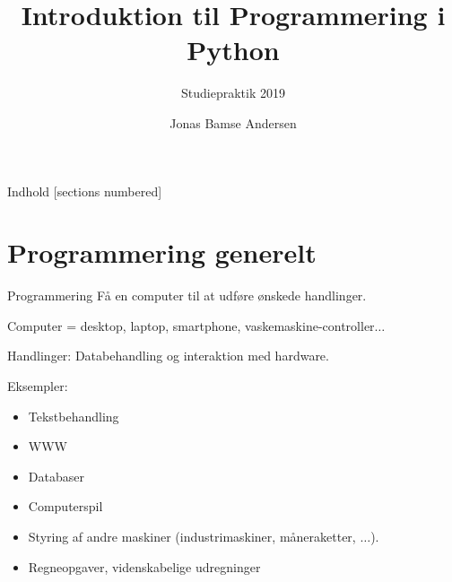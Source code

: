 \documentclass[10pt]{beamer}
\title{Introduktion til Programmering i Python}
\subtitle{Studiepraktik 2019}
\date{}
\author{Jonas Bamse Andersen}
\institute{Syddansk Universitet}
\begin{document}

\maketitle



\begin{frame}{Indhold}
  [sections numbered]
  \tableofcontents[hideallsubsections]
\end{frame}


\section{Programmering generelt}


\begin{frame}{Programmering}
Få en computer til at udføre ønskede handlinger.

\medskip

Computer = desktop, laptop, smartphone, vaskemaskine-controller$\dots$

\medskip

Handlinger: Databehandling og interaktion med hardware.

\medskip

Eksempler:

\begin{itemize}
 \item Tekstbehandling
 \item WWW
 \item Databaser
 \item Computerspil
 \item Styring af andre maskiner (industrimaskiner, måneraketter, $\dots$).
 \item Regneopgaver, videnskabelige udregninger
\end{itemize}
\end{frame}

\end{document}
